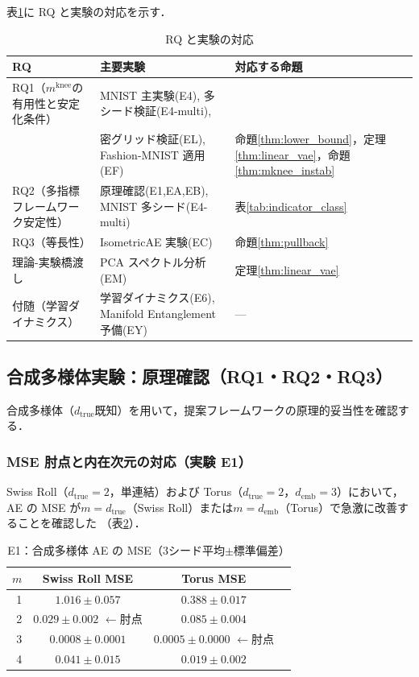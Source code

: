 \documentclass[11pt,a4paper]{jsarticle}
\newcommand{\dtrue}{d_{\mathrm{true}}}
\newcommand{\mknee}{m^{\mathrm{knee}}}
\newcommand{\demb}{d_{\mathrm{emb}}}
\begin{document}
表\ref{tab:rq_exp_map}に RQ と実験の対応を示す．

\begin{table}[H]
\centering
\caption{RQ と実験の対応}
\label{tab:rq_exp_map}
\small
\begin{tabular}{lll}
\toprule
RQ & 主要実験 & 対応する命題 \\
\midrule
RQ1（$\mknee$の有用性と安定化条件） & MNIST 主実験(E4), 多シード検証(E4-multi), & \\
 & 密グリッド検証(EL), Fashion-MNIST 適用(EF) & 命題\ref{thm:lower_bound}，定理\ref{thm:linear_vae}，命題\ref{thm:mknee_instab} \\
RQ2（多指標フレームワーク安定性） & 原理確認(E1,EA,EB), MNIST 多シード(E4-multi) & 表\ref{tab:indicator_class} \\
RQ3（等長性） & IsometricAE 実験(EC) & 命題\ref{thm:pullback} \\
理論-実験橋渡し & PCA スペクトル分析(EM) & 定理\ref{thm:linear_vae} \\
付随（学習ダイナミクス） & 学習ダイナミクス(E6), Manifold Entanglement 予備(EY) & --- \\
\bottomrule
\end{tabular}
\end{table}

\subsection{合成多様体実験：原理確認（RQ1・RQ2・RQ3）}\label{sec:exp_synthetic}

合成多様体（$\dtrue$既知）を用いて，提案フレームワークの原理的妥当性を確認する．

\subsubsection{MSE 肘点と内在次元の対応（実験 E1）}

Swiss Roll（$\dtrue = 2$，単連結）および Torus（$\dtrue = 2$，$\demb = 3$）において，
AE の MSE が$m = \dtrue$（Swiss Roll）または$m = \demb$（Torus）で急激に改善することを確認した
（表\ref{tab:e1}）．

\begin{table}[H]
\centering
\caption{E1：合成多様体 AE の MSE（3シード平均$\pm$標準偏差）}
\label{tab:e1}
\small
\begin{tabular}{rccc}
\toprule
$m$ & Swiss Roll MSE & Torus MSE \\
\midrule
1 & $1.016\pm0.057$ & $0.388\pm0.017$ \\
2 & $\boldsymbol{0.029\pm0.002}$ $\leftarrow$肘点 & $0.085\pm0.004$ \\
3 & $0.0008\pm0.0001$ & $\boldsymbol{0.0005\pm0.0000}$ $\leftarrow$肘点 \\
4 & $0.041\pm0.015$ & $0.019\pm0.002$ \\
\bottomrule
\end{tabular}
\end{table}
\end{document}
